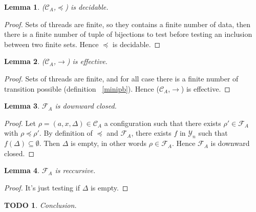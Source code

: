 \documentclass[a4paper,10pt]{report}
\newtheorem{lm}{Lemma}[thr]
\newtheorem{td}{TODO}
\newcommand{\C}{\mathcal{C}_{A}}
\newcommand{\F}{\mathcal{F}_{A}}
\newcommand{\Y}{\mathcal{Y}_{n}}
\begin{document}
\begin{lm} \label{cd2}
  ($\C$,$\preceq$) is decidable.
\end{lm}
\begin{proof}
  Sets of threads are finite, so they contains a finite number of data, then there is a finite number of tuple of bijections to test before testing an inclusion between two finite sets.
  Hence $\preceq$ is decidable.
\end{proof}

\begin{lm} \label{cd3}
  ($\C$,$\rightarrow$) is effective.
\end{lm}

\begin{proof}
   Sets of threads are finite, and for all case there is a finite number of transition possible (definition ~\ref{minipb}).
   Hence ($\C$,$\rightarrow$) is effective.
\end{proof}


\begin{lm} \label{cd5}
  $\F$ is downward closed. 
\end{lm}
\begin{proof}
  Let $\rho=(a,x,\Delta) \in \C$ a configuration such that there exists $\rho' \in \F$ with $\rho \preceq \rho'$.
  By definition of $\preceq$ and $\F$, there exists $f$ in $\Y$ such that $f(\Delta) \subseteq \emptyset$.
  Then $\Delta$ is empty, in other words $\rho \in \F$.
  Hence $\F$ is downward closed. 
\end{proof}

\begin{lm} \label{cd6}
  $\F$ is reccursive.
\end{lm}

\begin{proof}
  It's just testing if $\Delta$ is empty.
\end{proof}

\begin{td}
 Conclusion.
\end{td}
\end{document}
